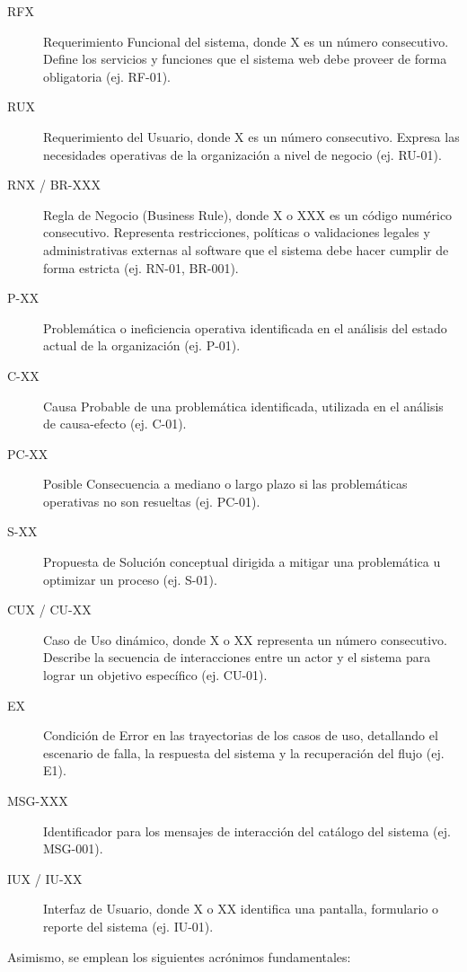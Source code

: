 \begin{description}
	\item[RFX] Requerimiento Funcional del sistema, donde X es un número consecutivo. Define los servicios y funciones que el sistema web debe proveer de forma obligatoria (ej. RF-01).
	\item[RUX] Requerimiento del Usuario, donde X es un número consecutivo. Expresa las necesidades operativas de la organización a nivel de negocio (ej. RU-01).
	\item[RNX / BR-XXX] Regla de Negocio (Business Rule), donde X o XXX es un código numérico consecutivo. Representa restricciones, políticas o validaciones legales y administrativas externas al software que el sistema debe hacer cumplir de forma estricta (ej. RN-01, BR-001).
	\item[P-XX] Problemática o ineficiencia operativa identificada en el análisis del estado actual de la organización (ej. P-01).
	\item[C-XX] Causa Probable de una problemática identificada, utilizada en el análisis de causa-efecto (ej. C-01).
	\item[PC-XX] Posible Consecuencia a mediano o largo plazo si las problemáticas operativas no son resueltas (ej. PC-01).
	\item[S-XX] Propuesta de Solución conceptual dirigida a mitigar una problemática u optimizar un proceso (ej. S-01).
	\item[CUX / CU-XX] Caso de Uso dinámico, donde X o XX representa un número consecutivo. Describe la secuencia de interacciones entre un actor y el sistema para lograr un objetivo específico (ej. CU-01).
	\item[EX] Condición de Error en las trayectorias de los casos de uso, detallando el escenario de falla, la respuesta del sistema y la recuperación del flujo (ej. E1).
	\item[MSG-XXX] Identificador para los mensajes de interacción del catálogo del sistema (ej. MSG-001).
	\item[IUX / IU-XX] Interfaz de Usuario, donde X o XX identifica una pantalla, formulario o reporte del sistema (ej. IU-01).
\end{description}

Asimismo, se emplean los siguientes acrónimos fundamentales:

